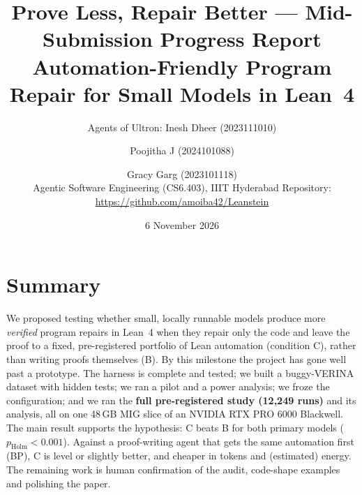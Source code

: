 \documentclass[10pt,twocolumn]{article}
\title{\vspace{-8mm}Prove Less, Repair Better --- Mid-Submission Progress Report\\[2pt]
\large Automation-Friendly Program Repair for Small Models in Lean~4\vspace{-1mm}}
\author{Agents of Ultron: Inesh Dheer (2023111010) \and Poojitha J (2024101088) \and Gracy Garg (2023101118)\\
\small Agentic Software Engineering (CS6.403), IIIT Hyderabad \quad
Repository: \url{https://github.com/amoiba42/Leanstein}}
\date{6 November 2026\vspace{-4mm}}
\begin{document}
\maketitle

\section*{Summary}
We proposed testing whether small, locally runnable models produce more \emph{verified} program repairs in
Lean~4 when they repair only the code and leave the proof to a fixed, pre-registered portfolio of Lean automation
(condition C), rather than writing proofs themselves (B). By this milestone the project has gone well past a
prototype. The harness is complete and tested; we built a buggy-VERINA dataset with hidden tests; we ran a pilot and
a power analysis; we froze the configuration; and we ran the \textbf{full pre-registered study (12,249 runs)} and
its analysis, all on one 48\,GB MIG slice of an NVIDIA RTX PRO 6000 Blackwell. The main result supports the
hypothesis: C beats B for both primary models ($p_\text{Holm}<0.001$). Against a proof-writing agent that gets the
same automation first (BP), C is level or slightly better, and cheaper in tokens and (estimated) energy. The
remaining work is human confirmation of the audit, code-shape examples and polishing the paper.
\end{document}
